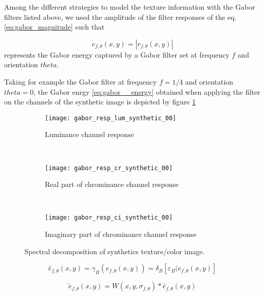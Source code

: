 Among the different strategies to model the texture information with the Gabor filters listed above, we used the amplitude of the filter responses of the eq. \eqref{eq:gabor_magnitude} such that

\begin{equation}\label{eq:gabor_energy}
	e_{f, \theta}(x,y) = |r_{f, \theta}(x,y)|
\end{equation}
represents the Gabor energy captured by a Gabor filter set at frequency $f$ and orientation $theta$. 

Taking for example the Gabor filter at frequency $f = 1/4$ and orientation  $theta = 0$, the Gabor enrgy \eqref{eq:gabor__energy} obtained when applying the filter on the channels of the synthetic image is depicted by figure \ref{fig:synthetic_img_gresponse_00} 

\begin{figure}[!ht]
    \centering
    \begin{subfigure}[b]{\textwidth}
        \texttt{[image: gabor\_resp\_lum\_synthetic\_00]}
        \caption{Luminance channel response}
    \end{subfigure} \\    
    \begin{subfigure}[b]{\textwidth}
    	\texttt{[image: gabor\_resp\_cr\_synthetic\_00]}
        \caption{Real part of chrominance channel response}
    \end{subfigure} \\    	
    \begin{subfigure}[b]{\textwidth}
        \texttt{[image: gabor\_resp\_ci\_synthetic\_00]}
        \caption{Imaginary part of chrominance channel response}
    \end{subfigure} 
    \caption{Spectral decomposition of synthetics texture/color image.}\label{fig:synthetic_img_gresponse_00}    
\end{figure}


\begin{equation}\label{eq:gabor_energy}
	\widehat{e}_{f, \theta}(x,y) = \gamma_B(e_{f, \theta}(x,y)) = \delta_B[\varepsilon_B(e_{f, \theta}(x,y)]
\end{equation}


\begin{equation}\label{eq:gabor_energy}
	\widetilde{e}_{f, \theta}(x,y) = W(x, y, \sigma_{f, \theta})\ast \widehat{e}_{f, \theta}(x,y)
\end{equation}






